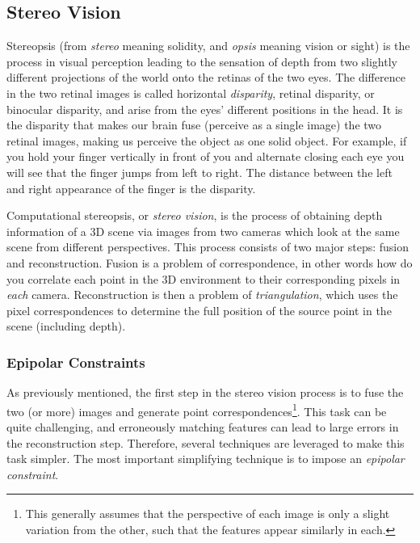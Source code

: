 \subsection{Stereo Vision}
Stereopsis (from \textit{stereo} meaning solidity, and \textit{opsis} meaning vision or sight) is the process in visual perception leading to the sensation of depth from two slightly different projections of the world onto the retinas of the two eyes. The difference in the two retinal images is called horizontal \textit{disparity}, retinal disparity, or binocular disparity, and arise from the eyes' different positions in the head. It is the disparity that makes our brain fuse (perceive as a single image) the two retinal images, making us perceive the object as one solid object. For example, if you hold your finger vertically in front of you and alternate closing each eye you will see that the finger jumps from left to right. The distance between the left and right appearance of the finger is the disparity.

Computational stereopsis, or \textit{stereo vision}, is the process of obtaining depth information of a 3D scene via images from two cameras which look at the same scene from different perspectives. This process consists of two major steps: fusion and reconstruction. Fusion is a problem of correspondence, in other words how do you correlate each point in the 3D environment to their corresponding pixels in \textit{each} camera. Reconstruction is then a problem of \textit{triangulation}, which uses the pixel correspondences to determine the full position of the source point in the scene (including depth).

\subsubsection{Epipolar Constraints}
As previously mentioned, the first step in the stereo vision process is to fuse the two (or more) images and generate point correspondences\footnote{This generally assumes that the perspective of each image is only a slight variation from the other, such that the features appear similarly in each.}. This task can be quite challenging, and erroneously matching features can lead to large errors in the reconstruction step. Therefore, several techniques are leveraged to make this task simpler. The most important simplifying technique is to impose an \textit{epipolar constraint}.

